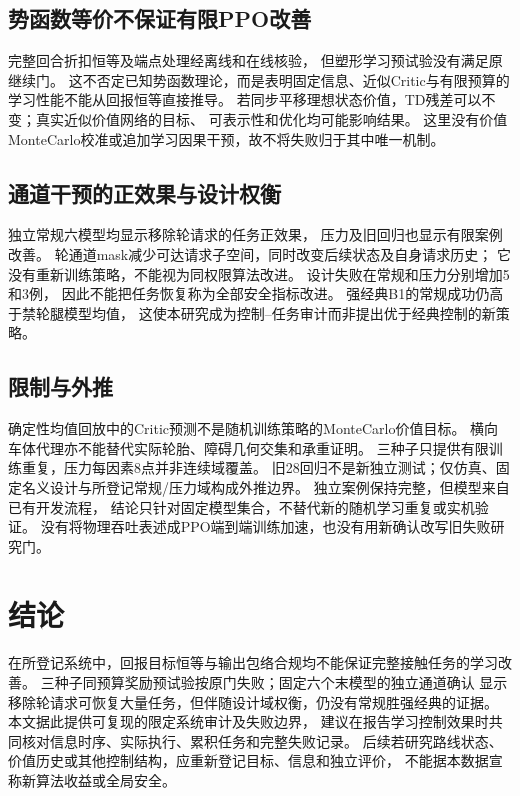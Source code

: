 \documentclass[UTF8,a4paper,11pt]{ctexart}
\begin{document}
\subsection{势函数等价不保证有限PPO改善}
完整回合折扣恒等及端点处理经离线和在线核验，
但塑形学习预试验没有满足原继续门。
这不否定已知势函数理论，而是表明固定信息、近似Critic与有限预算的
学习性能不能从回报恒等直接推导。
若同步平移理想状态价值，TD残差可以不变；真实近似价值网络的目标、
可表示性和优化均可能影响结果。
这里没有价值MonteCarlo校准或追加学习因果干预，故不将失败归于其中唯一机制。

\subsection{通道干预的正效果与设计权衡}
独立常规六模型均显示移除轮请求的任务正效果，
压力及旧回归也显示有限案例改善。
轮通道mask减少可达请求子空间，同时改变后续状态及自身请求历史；
它没有重新训练策略，不能视为同权限算法改进。
设计失败在常规和压力分别增加5和3例，
因此不能把任务恢复称为全部安全指标改进。
强经典B1的常规成功仍高于禁轮腿模型均值，
这使本研究成为控制--任务审计而非提出优于经典控制的新策略。

\subsection{限制与外推}
确定性均值回放中的Critic预测不是随机训练策略的MonteCarlo价值目标。
横向车体代理亦不能替代实际轮胎、障碍几何交集和承重证明。
三种子只提供有限训练重复，压力每因素8点并非连续域覆盖。
旧28回归不是新独立测试；仅仿真、固定名义设计与所登记常规/压力域构成外推边界。
独立案例保持完整，但模型来自已有开发流程，
结论只针对固定模型集合，不替代新的随机学习重复或实机验证。
没有将物理吞吐表述成PPO端到端训练加速，也没有用新确认改写旧失败研究门。

\section{结论}
在所登记系统中，回报目标恒等与输出包络合规均不能保证完整接触任务的学习改善。
三种子同预算奖励预试验按原门失败；固定六个末模型的独立通道确认
显示移除轮请求可恢复大量任务，但伴随设计域权衡，仍没有常规胜强经典的证据。
本文据此提供可复现的限定系统审计及失败边界，
建议在报告学习控制效果时共同核对信息时序、实际执行、累积任务和完整失败记录。
后续若研究路线状态、价值历史或其他控制结构，应重新登记目标、信息和独立评价，
不能据本数据宣称新算法收益或全局安全。

\appendix
\end{document}
